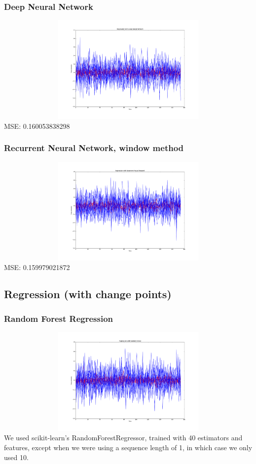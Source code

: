 \documentclass[12pt,a4paper]{article}
\begin{document}
\subsubsection{Deep Neural Network}
\includegraphics[height=200px, width=1\textwidth]{deep_nn_regression_projection_a_eq_b}
MSE: 0.160053838298 \\
\subsubsection{Recurrent Neural Network, window method}
\includegraphics[height=200px, width=1\textwidth]{window_rnn_regression_projection_a_eq_b}
MSE: 0.159979021872 \\

\subsection{Regression (with change points)}

\subsubsection{Random Forest Regression}
\includegraphics[height=200px, width=1\textwidth]{tree_regression_projection_a_neq_b}
We used scikit-learn's RandomForestRegressor, trained with 40 estimators and features, except when we were using a sequence length of 1, in which case we only used 10.  
\end{document}
